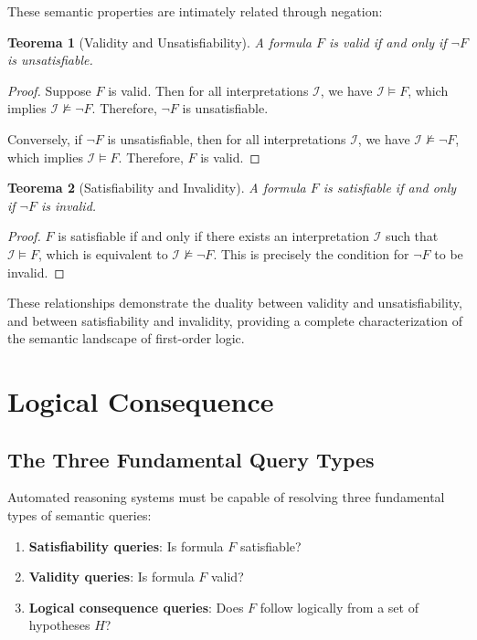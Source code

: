 \documentclass[11pt,a4paper]{article}
\theoremstyle{definition}
\theoremstyle{plain}
\newtheorem{theorem}{Teorema}[section]
\theoremstyle{remark}
\begin{document}
These semantic properties are intimately related through negation:

\begin{theorem}[Validity and Unsatisfiability]
A formula $F$ is valid if and only if $\neg F$ is unsatisfiable.
\end{theorem}

\begin{proof}
Suppose $F$ is valid. Then for all interpretations $\mathcal{I}$, we have $\mathcal{I} \models F$, which implies $\mathcal{I} \not\models \neg F$. Therefore, $\neg F$ is unsatisfiable.

Conversely, if $\neg F$ is unsatisfiable, then for all interpretations $\mathcal{I}$, we have $\mathcal{I} \not\models \neg F$, which implies $\mathcal{I} \models F$. Therefore, $F$ is valid.
\end{proof}

\begin{theorem}[Satisfiability and Invalidity]
A formula $F$ is satisfiable if and only if $\neg F$ is invalid.
\end{theorem}

\begin{proof}
$F$ is satisfiable if and only if there exists an interpretation $\mathcal{I}$ such that $\mathcal{I} \models F$, which is equivalent to $\mathcal{I} \not\models \neg F$. This is precisely the condition for $\neg F$ to be invalid.
\end{proof}

These relationships demonstrate the duality between validity and unsatisfiability, and between satisfiability and invalidity, providing a complete characterization of the semantic landscape of first-order logic.

\section{Logical Consequence}

\subsection{The Three Fundamental Query Types}

Automated reasoning systems must be capable of resolving three fundamental types of semantic queries:
\begin{enumerate}
    \item \textbf{Satisfiability queries}: Is formula $F$ satisfiable?
    \item \textbf{Validity queries}: Is formula $F$ valid?
    \item \textbf{Logical consequence queries}: Does $F$ follow logically from a set of hypotheses $H$?
\end{enumerate}
\end{document}
